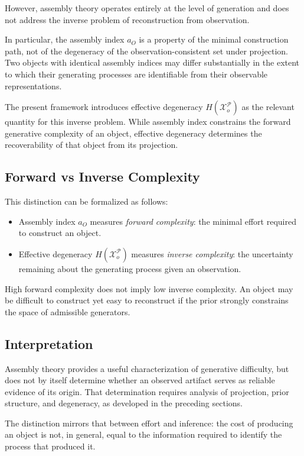 \documentclass[12pt, oneside]{article}
\theoremstyle{plain}
\theoremstyle{definition}
\theoremstyle{remark}
\newcommand{\config}{\mathcal{X}}
\newcommand{\prior}{\mathcal{P}}
\begin{document}
However, assembly theory operates entirely at the level of generation and does not
address the inverse problem of reconstruction from observation.

In particular, the assembly index $a_O$ is a property of the minimal construction
path, not of the degeneracy of the observation-consistent set under projection.
Two objects with identical assembly indices may differ substantially in the extent
to which their generating processes are identifiable from their observable
representations.

The present framework introduces effective degeneracy $H(\config_o^{\prior})$ as
the relevant quantity for this inverse problem. While assembly index constrains
the forward generative complexity of an object, effective degeneracy determines
the recoverability of that object from its projection.

\subsection{Forward vs Inverse Complexity}

This distinction can be formalized as follows:

\begin{itemize}[leftmargin=2em]
\item Assembly index $a_O$ measures \emph{forward complexity}: the minimal effort
required to construct an object.
\item Effective degeneracy $H(\config_o^{\prior})$ measures \emph{inverse complexity}:
the uncertainty remaining about the generating process given an observation.
\end{itemize}

High forward complexity does not imply low inverse complexity. An object may be
difficult to construct yet easy to reconstruct if the prior strongly constrains
the space of admissible generators.

\subsection{Interpretation}

Assembly theory provides a useful characterization of generative difficulty, but
does not by itself determine whether an observed artifact serves as reliable
evidence of its origin. That determination requires analysis of projection,
prior structure, and degeneracy, as developed in the preceding sections.

The distinction mirrors that between effort and inference: the cost of producing
an object is not, in general, equal to the information required to identify the
process that produced it.
\end{document}
